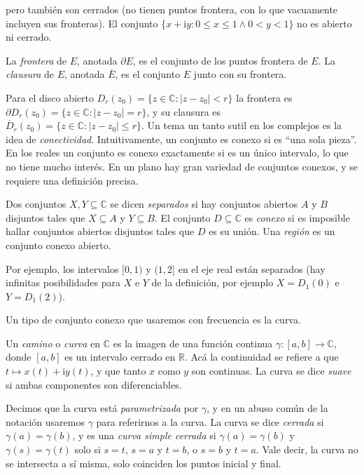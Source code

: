   pero también son cerrados
  (no tienen puntos frontera,
   con lo que vacuamente incluyen sus fronteras).
  El conjunto
    \(\{ x + \mathrm{i} y \colon 0 \le x \le 1 \wedge 0 < y < 1 \}\)
  no es abierto ni cerrado.
  \begin{definition}
    La \emph{frontera} de \(E\),%
    anotada \(\partial E\),
    es el conjunto de los puntos frontera de \(E\).
    La \emph{clausura} de \(E\),%
    anotada \(\overline{E}\),
    es el conjunto \(E\) junto con su frontera.
  \end{definition}
  Para el disco abierto
    \(D_r(z_0)
	= \{ z \in \mathbb{C} \colon\lvert z - z_0 \rvert < r \}\)
  la frontera es
    \(\partial D_r(z_0)
	= \{ z \in \mathbb{C} \colon \lvert z - z_0 \rvert = r \}\),
  y su clausura es
    \(\overline{D}_r(z_0)
	= \{ z \in \mathbb{C}
	     \colon \lvert z - z_0 \rvert \le r \}\).
  Un tema un tanto sutil en los complejos
  es la idea de \emph{conectividad}.%
  Intuitivamente,
  un conjunto es conexo si es ``una sola pieza''.
  En los reales un conjunto es conexo
  exactamente si es un único intervalo,
  lo que no tiene mucho interés.
  En un plano hay gran variedad de conjuntos conexos,
  y se requiere una definición precisa.
  \begin{definition}
    Dos conjuntos \(X, Y \subseteq \mathbb{C}\)
    se dicen \emph{separados}
    si hay conjuntos abiertos \(A\) y \(B\) disjuntos
    tales que \(X \subseteq A\) y \(Y \subseteq B\).
    El conjunto \(D \subseteq \mathbb{C}\) es \emph{conexo}
    si es imposible hallar conjuntos abiertos disjuntos
    tales que \(D\) es su unión.
    Una \emph{región} es un conjunto conexo abierto.
  \end{definition}
  Por ejemplo,
  los intervalos \([0, 1)\) y \((1, 2]\) en el eje real
  están separados
  (hay infinitas posibilidades para \(X\) e \(Y\) de la definición,
   por ejemplo \(X = D_1(0)\) e \(Y = D_1(2)\)).

  Un tipo de conjunto conexo
  que usaremos con frecuencia es la curva.
  \begin{definition}
    Un \emph{camino} o \emph{curva} en \(\mathbb{C}\)
    es la imagen de una función continua
      \(\gamma \colon [a, b] \rightarrow \mathbb{C}\),
    donde \([a, b]\) es un intervalo cerrado en \(\mathbb{R}\).
    Acá la continuidad
    se refiere a que \(t \mapsto x(t) + \mathrm{i} y(t)\),
    y que tanto \(x\) como \(y\) son continuas.
    La curva se dice \emph{suave}
    si ambas componentes son diferenciables.
  \end{definition}
  Decimos que la curva está \emph{parametrizada} por \(\gamma\),
  y en un abuso común de la notación usaremos \(\gamma\)
  para referirnos a la curva.
  La curva se dice \emph{cerrada} si \(\gamma(a) = \gamma(b)\),
  y es una \emph{curva simple cerrada} si \(\gamma(a) = \gamma(b)\)%
  y \(\gamma(s) = \gamma(t)\) solo si \(s = t\),
  \(s = a\) y \(t = b\),
  o \(s = b\) y \(t = a\).
  Vale decir,
  la curva no se intersecta a sí misma,
  solo coinciden los puntos inicial y final.

